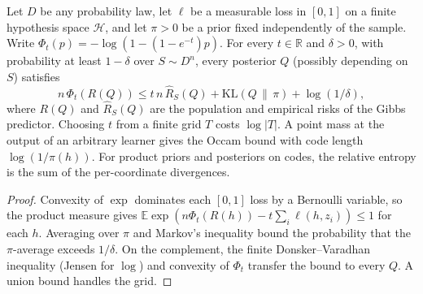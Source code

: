 \begin{theorem}\label{thm:catoni_pac_bayes}
\leanok
Let $D$ be any probability law, let $\ell$ be a measurable loss in $[0,1]$ on a
finite hypothesis space $\mathcal H$, and let $\pi>0$ be a prior fixed
independently of the sample. Write
$\Phi_t(p)=-\log(1-(1-e^{-t})p)$. For every $t\in\mathbb R$ and $\delta>0$,
with probability at least $1-\delta$ over $S\sim D^n$, every posterior $Q$
(possibly depending on $S$) satisfies
\[
 n\,\Phi_t(R(Q)) \le t\,n\,\widehat R_S(Q) + \mathrm{KL}(Q\,\|\,\pi) + \log(1/\delta),
\]
where $R(Q)$ and $\widehat R_S(Q)$ are the population and empirical risks of
the Gibbs predictor. Choosing $t$ from a finite grid $T$ costs $\log|T|$.
A point mass at the output of an arbitrary learner gives the Occam bound with
code length $\log(1/\pi(h))$. For product priors and posteriors on codes, the
relative entropy is the sum of the per-coordinate divergences.
\end{theorem}
\begin{proof}
\leanok
Convexity of $\exp$ dominates each $[0,1]$ loss by a Bernoulli variable, so the
product measure gives $\mathbb E\exp(n\Phi_t(R(h))-t\sum_i\ell(h,z_i))\le1$
for each $h$. Averaging over $\pi$ and Markov's inequality bound the
probability that the $\pi$-average exceeds $1/\delta$. On the complement, the
finite Donsker--Varadhan inequality (Jensen for $\log$) and convexity of
$\Phi_t$ transfer the bound to every $Q$. A union bound handles the grid.
\end{proof}

